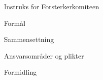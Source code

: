 
\begin{instruks}{Instruks for Forsterkerkomiteen}{}{}

    \begin{instruksledd}{Formål}
        \begin{enumerate}

        \end{enumerate}
        
    \end{instruksledd}

    \begin{instruksledd}{Sammensettning}
        \begin{enumerate}

        \end{enumerate}
    \end{instruksledd}

    \begin{instruksledd}{Ansvarsområder og plikter}
        \begin{enumerate}
                
        \end{enumerate}
    \end{instruksledd}

    \begin{instruksledd}{Formidling}
        \begin{enumerate}

        \end{enumerate}
    \end{instruksledd}


\end{instruks}

